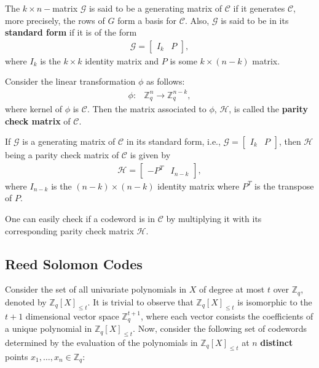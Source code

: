 \begin{definition}
  The $k\times n-$matrix $\mathcal{G}$ is said to be a generating matrix of $\mathcal{C}$ if it 
  generates $\mathcal{C}$, more precisely, the rows of $G$ form a basis for $\mathcal{C}$. Also, $\mathcal{G}$ is said to be in its 
  \textbf{standard form} if it is of the form
  \begin{align*}
    \mathcal{G} = \begin{bmatrix}
      I_k & P
    \end{bmatrix},
  \end{align*}
  where $I_k$ is the $k\times k$ identity matrix and $P$ is some $k\times (n-k)$ matrix.
\end{definition}

\begin{definition}
  Consider the linear transformation $\phi$ as follows:
  \begin{align*}
    \phi:& \mathbb{Z}_q^n \rightarrow \mathbb{Z}_q^{n-k},
  \end{align*}
  where kernel of $\phi$ is $\mathcal{C}$. Then the matrix associated to $\phi$, $\mathcal{H}$, 
  is called the \textbf{parity check matrix} of $\mathcal{C}$.
\end{definition}

\begin{lemma}\cite{gallian2024contemporary}
  If $\mathcal{G}$ is a generating matrix of $\mathcal{C}$ in its standard form, i.e., $\mathcal{G} = \begin{bmatrix}
    I_k & P
  \end{bmatrix}$, then $\mathcal{H}$ being a parity check matrix of $\mathcal{C}$ is given by
  \begin{align*}
    \mathcal{H} = \begin{bmatrix}
      -P^T & I_{n-k}
    \end{bmatrix},
  \end{align*}
  where $I_{n-k}$ is the $(n-k)\times (n-k)$ identity matrix where $P^T$ is the transpose of $P$.
\end{lemma}

One can easily check if a codeword is in $\mathcal{C}$ by multiplying it with its corresponding parity 
check matrix $\mathcal{H}$.

\subsection{Reed Solomon Codes}
\label{subsec:reed-solomon}
Consider the set of all univariate polynomials in $X$ of degree at most $t$ over $\mathbb{Z}_q$, denoted by 
$\mathbb{Z}_q[X]_{\leq t}$. It is trivial to observe that $\mathbb{Z}_q[X]_{\leq t}$ is isomorphic to 
the $t+1$ dimensional vector space $\mathbb{Z}_q^{t+1}$, where each vector consists the coefficients of 
a unique polynomial in $\mathbb{Z}_q[X]_{\leq t}$. Now, consider the following set of codewords 
determined by the evaluation of the polynomials in $\mathbb{Z}_q[X]_{\leq t}$ at $n$ \textbf{distinct} 
points $x_1,\dots,x_n\in \mathbb{Z}_q$:

